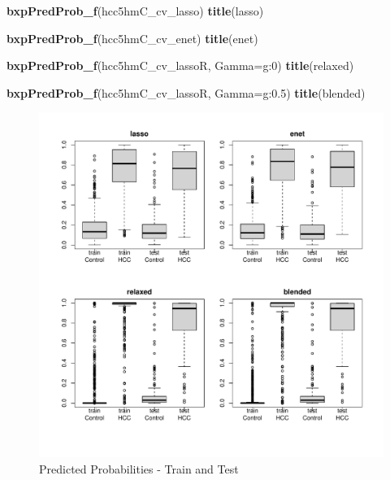 \documentclass[
]{book}
\newenvironment{Shaded}{\begin{snugshade}}{\end{snugshade}}
\newcommand{\DataTypeTok}[1]{\textcolor[rgb]{0.13,0.29,0.53}{#1}}
\newcommand{\KeywordTok}[1]{\textcolor[rgb]{0.13,0.29,0.53}{\textbf{#1}}}
\newcommand{\NormalTok}[1]{#1}
\newcommand{\StringTok}[1]{\textcolor[rgb]{0.31,0.60,0.02}{#1}}
\begin{document}
\begin{Shaded}
\begin{Highlighting}[]
\KeywordTok{bxpPredProb\_f}\NormalTok{(hcc5hmC\_cv\_lasso)}
\KeywordTok{title}\NormalTok{(}\StringTok{\textquotesingle{}lasso\textquotesingle{}}\NormalTok{)}

\KeywordTok{bxpPredProb\_f}\NormalTok{(hcc5hmC\_cv\_enet)}
\KeywordTok{title}\NormalTok{(}\StringTok{\textquotesingle{}enet\textquotesingle{}}\NormalTok{)}

\KeywordTok{bxpPredProb\_f}\NormalTok{(hcc5hmC\_cv\_lassoR, }\DataTypeTok{Gamma=}\StringTok{\textquotesingle{}g:0\textquotesingle{}}\NormalTok{)}
\KeywordTok{title}\NormalTok{(}\StringTok{\textquotesingle{}relaxed\textquotesingle{}}\NormalTok{)}

\KeywordTok{bxpPredProb\_f}\NormalTok{(hcc5hmC\_cv\_lassoR, }\DataTypeTok{Gamma=}\StringTok{\textquotesingle{}g:0.5\textquotesingle{}}\NormalTok{)}
\KeywordTok{title}\NormalTok{(}\StringTok{\textquotesingle{}blended\textquotesingle{}}\NormalTok{)}
\end{Highlighting}
\end{Shaded}

\begin{figure}
\centering
\includegraphics{Static/figures/hcc5hmC-glmnetFit-fitPrevalByGroup-1.pdf}
\caption{\label{fig:hcc5hmC-glmnetFit-fitPrevalByGroup}Predicted Probabilities - Train and Test}
\end{figure}
\end{document}
